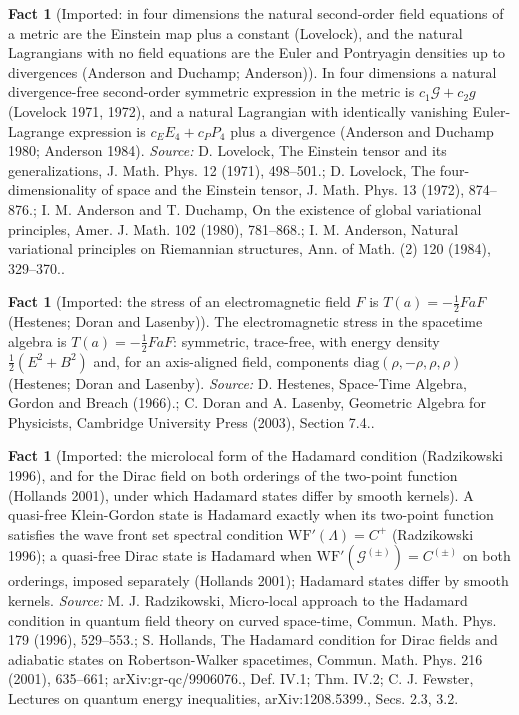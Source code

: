 \documentclass[11pt]{article}
\theoremstyle{definition}
\newtheorem{fact}[theorem]{Fact}
\theoremstyle{plain}
\begin{document}
\begin{fact}[Imported: in four dimensions the natural second-order field equations of a metric are the Einstein map plus a constant (Lovelock), and the natural Lagrangians with no field equations are the Euler and Pontryagin densities up to divergences (Anderson and Duchamp; Anderson)]\label{c:synthesis.imported-lovelock-and-anderson-duchamp-natural-lagrangians}
In four dimensions a natural divergence-free second-order symmetric expression in the metric is $c_{1}\mathcal{G} + c_{2}g$ (Lovelock 1971, 1972), and a natural Lagrangian with identically vanishing Euler-Lagrange expression is $c_{E}E_{4} + c_{P}P_{4}$ plus a divergence (Anderson and Duchamp 1980; Anderson 1984).
\emph{Source:} D. Lovelock, The Einstein tensor and its generalizations, J. Math. Phys. 12 (1971), 498--501.; D. Lovelock, The four-dimensionality of space and the Einstein tensor, J. Math. Phys. 13 (1972), 874--876.; I. M. Anderson and T. Duchamp, On the existence of global variational principles, Amer. J. Math. 102 (1980), 781--868.; I. M. Anderson, Natural variational principles on Riemannian structures, Ann. of Math. (2) 120 (1984), 329--370..
\end{fact}

\begin{fact}[Imported: the stress of an electromagnetic field $F$ is $T(a) = -\tfrac12 FaF$ (Hestenes; Doran and Lasenby)]\label{c:synthesis.imported-maxwell-stress-spacetime-algebra}
The electromagnetic stress in the spacetime algebra is $T(a) = -\tfrac12 FaF$: symmetric, trace-free, with energy density $\tfrac12(E^{2} + B^{2})$ and, for an axis-aligned field, components $\mathrm{diag}(\rho, -\rho, \rho, \rho)$ (Hestenes; Doran and Lasenby).
\emph{Source:} D. Hestenes, Space-Time Algebra, Gordon and Breach (1966).; C. Doran and A. Lasenby, Geometric Algebra for Physicists, Cambridge University Press (2003), Section 7.4..
\end{fact}

\begin{fact}[Imported: the microlocal form of the Hadamard condition (Radzikowski 1996), and for the Dirac field on both orderings of the two-point function (Hollands 2001), under which Hadamard states differ by smooth kernels]\label{c:synthesis.imported-microlocal-hadamard-condition}
A quasi-free Klein-Gordon state is Hadamard exactly when its two-point function satisfies the wave front set spectral condition $\mathrm{WF}'(\Lambda) = C^{+}$ (Radzikowski 1996); a quasi-free Dirac state is Hadamard when $\mathrm{WF}'(\mathcal{G}^{(\pm)}) = C^{(\pm)}$ on both orderings, imposed separately (Hollands 2001); Hadamard states differ by smooth kernels.
\emph{Source:} M. J. Radzikowski, Micro-local approach to the Hadamard condition in quantum field theory on curved space-time, Commun. Math. Phys. 179 (1996), 529--553.; S. Hollands, The Hadamard condition for Dirac fields and adiabatic states on Robertson-Walker spacetimes, Commun. Math. Phys. 216 (2001), 635--661; arXiv:gr-qc/9906076., Def. IV.1; Thm. IV.2; C. J. Fewster, Lectures on quantum energy inequalities, arXiv:1208.5399., Secs. 2.3, 3.2.
\end{fact}
\end{document}
